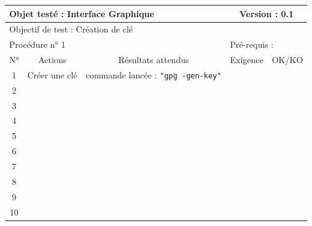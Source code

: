 \documentclass{../res/univ-projet}
\begin{document}
\begin{center}
    \begin{tabular}{|c|p{5cm}|p{5cm}|p{1.5cm}|p{1.5cm}|}
      \hline
      \multicolumn{3}{|l|}{Objet testé : Interface Graphique} & \multicolumn{2}{c|}{Version : 0.1}\\ \hline
      \multicolumn{5}{|l|}{Objectif de test : Création de clé}\\ \hline
      \multicolumn{3}{|l|}{Procédure n° 1} & \multicolumn{2}{p{3cm}|}{Pré-requis : }\\ \hline
      \multicolumn{1}{|c|}{N°} & \multicolumn{1}{c|}{Actions} & \multicolumn{1}{c|}{Résultats attendus} & 
      \multicolumn{1}{c|}{Exigence} & \multicolumn{1}{c|}{OK/KO}\\ \hline
      1 & Créer une clé & commande lancée : \texttt{"gpg -\-gen-key"} &  & \\
      2 &  &  &  & \\
      3 &  &  &  & \\ 
      4 &  &  &  & \\
      5 &  &  &  & \\
      6 &  &  &  & \\
      7 &  &  &  & \\
      8 &  &  &  & \\
      9 &  &  &  & \\
      10 &  &  &  &\\ 
	\hline
    \end{tabular}
    \vskip 2.2cm




\end{center}
\end{document}
